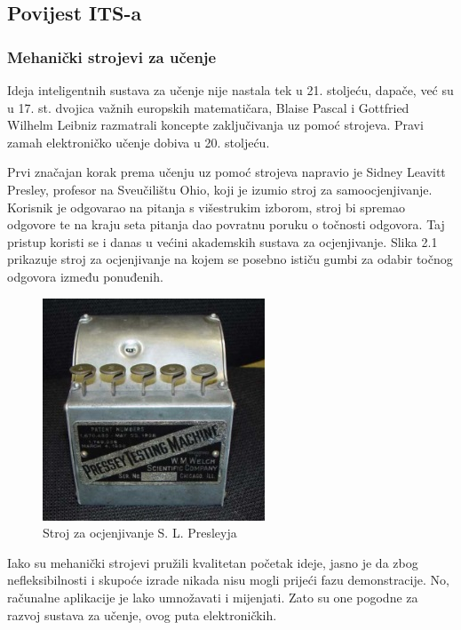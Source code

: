 \documentclass[times, utf8, zavrsni, numeric]{fer}
\begin{document}
\subsection{Povijest ITS-a}

\subsubsection{Mehanički strojevi za učenje}
Ideja inteligentnih sustava za učenje nije nastala tek u 21. stoljeću, dapače, već su u 17. st. dvojica važnih europskih matematičara, Blaise Pascal i Gottfried Wilhelm Leibniz razmatrali koncepte zaključivanja uz pomoć strojeva.\citep{leibniz}\citep{pascal} Pravi zamah elektroničko učenje dobiva u 20. stoljeću.
\par
Prvi značajan korak prema učenju uz pomoć strojeva napravio je Sidney Leavitt Presley, profesor na Sveučilištu Ohio, koji je izumio stroj za samoocjenjivanje.\citep{pressey} Korisnik je odgovarao na pitanja s višestrukim izborom, stroj bi spremao odgovore te na kraju seta pitanja dao povratnu poruku o točnosti odgovora. Taj pristup koristi se i danas u većini akademskih sustava za ocjenjivanje. Slika 2.1 prikazuje stroj za ocjenjivanje na kojem se posebno ističu gumbi za odabir točnog odgovora između ponuđenih.

\begin{figure}[htb]
	\centering
	\includegraphics[]{img/pressey.jpg}
	\caption{Stroj za ocjenjivanje S. L. Presleyja\citep{presseymachinepic}}
	\label{fig:pressey}
\end{figure}

Iako su mehanički strojevi pružili kvalitetan početak ideje, jasno je da zbog nefleksibilnosti i skupoće izrade nikada nisu mogli prijeći fazu demonstracije. No, računalne aplikacije je lako umnožavati i mijenjati. Zato su one pogodne za razvoj sustava za učenje, ovog puta elektroničkih.
\end{document}
